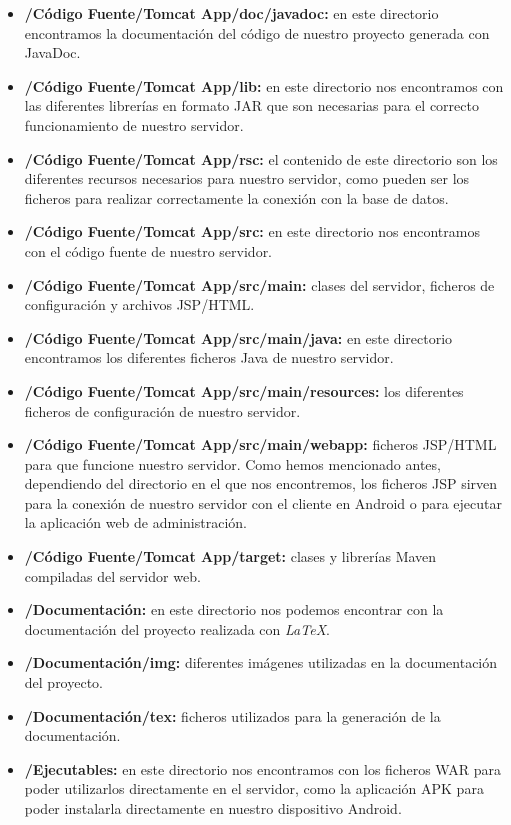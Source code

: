 \begin{itemize}
	\item 
	\textbf{/Código Fuente/Tomcat App/doc/javadoc:} en este directorio encontramos la documentación del código de nuestro proyecto generada con JavaDoc.
	\item 
	\textbf{/Código Fuente/Tomcat App/lib:} en este directorio nos encontramos con las diferentes librerías en formato JAR que son necesarias para el correcto funcionamiento de nuestro servidor.
	\item 
	\textbf{/Código Fuente/Tomcat App/rsc:} el contenido de este directorio son los diferentes recursos necesarios para nuestro servidor, como pueden ser los ficheros para realizar correctamente la conexión con la base de datos.
	\item 
	\textbf{/Código Fuente/Tomcat App/src:} en este directorio nos encontramos con el código fuente de nuestro servidor.
	\item 
	\textbf{/Código Fuente/Tomcat App/src/main:} clases del servidor, ficheros de configuración y archivos JSP/HTML.
	\item 
	\textbf{/Código Fuente/Tomcat App/src/main/java:} en este directorio encontramos los diferentes ficheros Java de nuestro servidor.
	\item 
	\textbf{/Código Fuente/Tomcat App/src/main/resources:} los diferentes ficheros de configuración de nuestro servidor.
	\item 
	\textbf{/Código Fuente/Tomcat App/src/main/webapp:} ficheros JSP/HTML para que funcione nuestro servidor. Como hemos mencionado antes, dependiendo del directorio en el que nos encontremos, los ficheros JSP sirven para la conexión de nuestro servidor con el cliente en Android o para ejecutar la aplicación web de administración.
	\item 
	\textbf{/Código Fuente/Tomcat App/target:} clases y librerías Maven compiladas del servidor web.
	\item 
	\textbf{/Documentación:} en este directorio nos podemos encontrar con la documentación del proyecto realizada con \textit{LaTeX}.
	\item 
	\textbf{/Documentación/img:} diferentes imágenes utilizadas en la documentación del proyecto.
	\item 
	\textbf{/Documentación/tex:} ficheros utilizados para la generación de la documentación.
	\item 
	\textbf{/Ejecutables:} en este directorio nos encontramos con los ficheros WAR para poder utilizarlos directamente en el servidor, como la aplicación APK para poder instalarla directamente en nuestro dispositivo Android.
\end{itemize}

